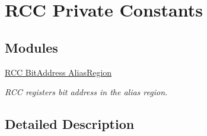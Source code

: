 \hypertarget{group___r_c_c___private___constants}{}\section{R\+CC Private Constants}
\label{group___r_c_c___private___constants}
\subsection*{Modules}
\begin{DoxyCompactItemize}
\item 
\hyperlink{group___r_c_c___bit_address___alias_region}{R\+C\+C Bit\+Address Alias\+Region}
\begin{DoxyCompactList}\small\item\em R\+CC registers bit address in the alias region. \end{DoxyCompactList}\end{DoxyCompactItemize}


\subsection{Detailed Description}
